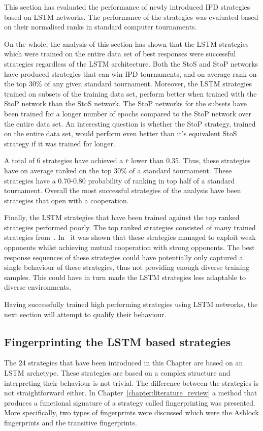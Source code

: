 This section has evaluated the performance of \lstmstrategies newly introduced
IPD strategies based on LSTM networks. The performance of the strategies was
evaluated based on their normalised ranks in \metatournamentslstm standard
computer tournaments.

On the whole, the analysis of this section has shown that
the LSTM strategies
which were trained on the entire data set of best responses were successful
strategies regardless of the LSTM architecture. Both the StoS and StoP networks
have produced strategies that can win IPD tournaments, and on average rank on
the top 30\% of any given standard tournament. Moreover, the LSTM strategies
trained on subsets of the training data set, perform better when trained with
the StoP network than the StoS network. The StoP networks for the subsets have
been trained for a longer number of epochs compared to the StoP network over the
entire data set. An interesting question is whether the StoP strategy, trained
on the entire data set, would perform even better than it's equivalent StoS
strategy if it was trained for longer.

A total of 6 strategies have achieved a \(\bar{r}\) lower than 0.35. Thus, these
strategies have on average ranked on the top 30\% of a standard tournament.
These strategies have a 0.70-0.80 probability of ranking in top half of a
standard tournament. Overall the most successful strategies of the analysis have
been strategies that open with a cooperation.

Finally, the LSTM strategies that have been trained against the top ranked
strategies performed poorly. The top ranked strategies consisted of many trained
strategies from~\cite{Harper2017}. In~\cite{Harper2017} it was shown that these
strategies managed to exploit weak opponents whilst achieving mutual cooperation
with strong opponents. The best response sequences of these strategies could
have potentially only captured a single behaviour of these strategies, thus not
providing enough diverse training samples. This could have in turn made the LSTM
strategies less adaptable to diverse environments.

Having successfully trained high performing strategies using LSTM networks, 
the next section will attempt to qualify their behaviour.
\subsection{Fingerprinting the LSTM based strategies}

The 24 strategies that have been introduced in this Chapter are based on an LSTM
archetype. These strategies are based on a complex structure and interpreting
their behaviour is not trivial. The difference between the strategies is not
straightforward either. In Chapter~\ref{chapter:literature_review} a method that
produces a functional signature of a strategy called fingerprinting was
presented. More specifically, two types of fingerprints were discussed which
were the Ashlock fingerprints and the transitive fingerprints.

